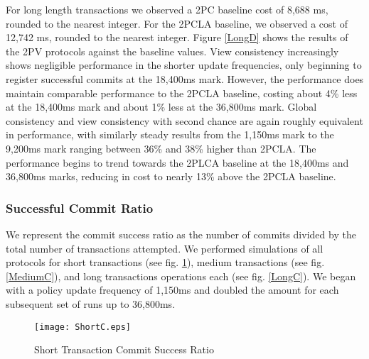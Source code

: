 \documentclass[11pt]{article}
\begin{document}
For long length transactions we observed a 2PC baseline cost of 8,688 ms, rounded to the nearest integer. For the 2PCLA baseline, we observed a cost of 12,742 ms, rounded to the nearest integer. Figure \ref{LongD} shows the results of the 2PV protocols against the baseline values. View consistency increasingly shows negligible performance in the shorter update frequencies, only beginning to register successful commits at the 18,400ms mark. However, the performance does maintain comparable performance to the 2PCLA baseline, costing about 4\% less at the 18,400ms mark and about 1\% less at the 36,800ms mark. Global consistency and view consistency with second chance are again roughly equivalent in performance, with similarly steady results from the 1,150ms mark to the 9,200ms mark ranging between 36\% and 38\% higher than 2PCLA. The performance begins to trend towards the 2PLCA baseline at the 18,400ms and 36,800ms marks, reducing in cost to nearly 13\% above the 2PCLA baseline.
\subsubsection{Successful Commit Ratio}
We represent the commit success ratio as the number of commits divided by the total number of transactions attempted. We performed simulations of all protocols for short transactions (see fig. \ref{ShortC}), medium transactions (see fig. \ref{MediumC}), and long transactions operations each (see fig. \ref{LongC}). We began with a policy update frequency of 1,150ms and doubled the amount for each subsequent set of runs up to 36,800ms.
\begin{figure}[h]
\begin{center}
\texttt{[image: ShortC.eps]}
\caption{Short Transaction Commit Success Ratio}
\label{ShortC}
\end{center}
\end{figure}
\end{document}
